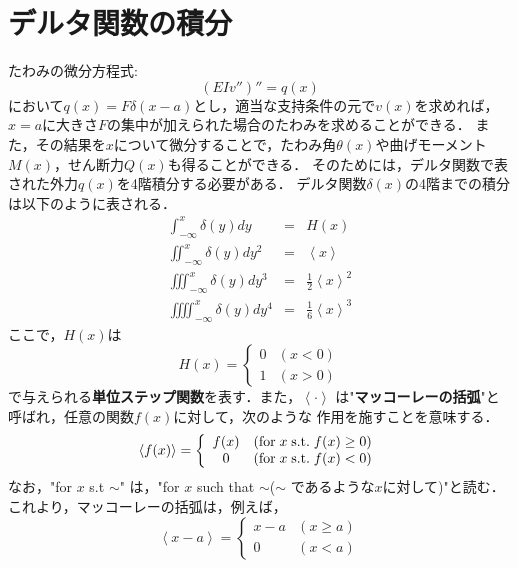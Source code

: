 \documentclass[10pt,a4j]{jbook}
\begin{document}
\section{デルタ関数の積分}
たわみの微分方程式:
\begin{equation}
	\left(EIv''\right)''=q(x)
\end{equation}
において$q(x)=F\delta(x-a)$とし，適当な支持条件の元で$v(x)$を求めれば，
$x=a$に大きさ$F$の集中が加えられた場合のたわみを求めることができる．
また，その結果を$x$について微分することで，たわみ角$\theta(x)$や曲げモーメント
$M(x)$，せん断力$Q(x)$も得ることができる．
そのためには，デルタ関数で表された外力$q(x)$を4階積分する必要がある．
デルタ関数$\delta(x)$の4階までの積分は以下のように表される．
\begin{eqnarray}
	\int_{-\infty}^x \delta(y)dy &=& H(x) 
	\label{eqn:int_dlt}
	\\ 
	\iint_{-\infty}^x \delta(y)dy^2 &=& \left< x\right> 
	\label{eqn:iint_dlt}
	\\ 
	\iiint_{-\infty}^x \delta(y)dy^3 &=& \frac{1}{2}\left<x\right>^2
	\label{eqn:iiint_dlt}
	\\ 
	\iiiint_{-\infty}^x \delta(y)dy^4 &=& \frac{1}{6}\left<x\right>^3
	\label{eqn:iiiint_dlt}
\end{eqnarray}
ここで，$H(x)$は
\begin{equation}
	H(x)=\left\{
	\begin{array}{cc}
		0 & (x<0) \\
		1 & (x>0)
	\end{array}
	\right.
\end{equation}
で与えられる{\bf 単位ステップ関数}を表す．また，$\left< \cdot \right>$
は"{\bf マッコーレーの括弧}"と呼ばれ，任意の関数$f(x)$に対して，次のような
作用を施すことを意味する．
\begin{equation}
	\left< f(x) \right>=
	\left\{
	\begin{array}{cc}
		f(x) & ({\rm for\;} x\; {\rm s.t.} \; f(x) \ge 0) \\
		0 & ({\rm for}\; x \; {\rm s.t.} \;  f(x) < 0)
	\end{array}
	\right.
\end{equation}
なお，"for $x$ s.t $\sim$" は，"for $x$ such that $\sim $($\sim$ であるような$x$に対して)"と読む．
これより，マッコーレーの括弧は，例えば，
\begin{equation}
	\left< x-a \right>=
	\left\{
	\begin{array}{cc}
		x-a & (x \ge a) \\
		0 & (x <a)
	\end{array}
	\right.
\end{equation}
\end{document}
